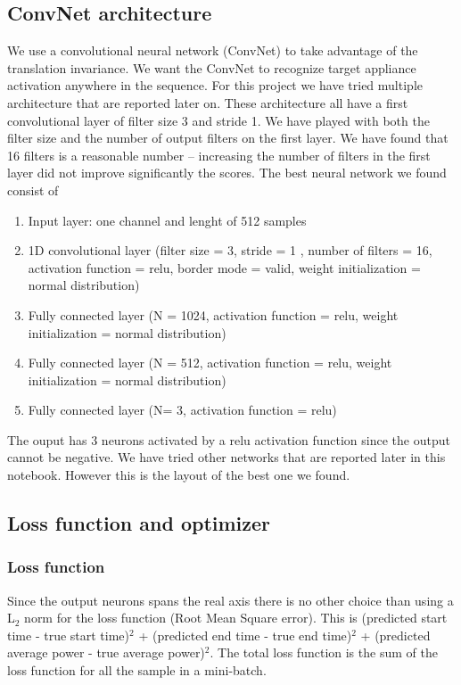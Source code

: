 \documentclass[11pt]{article}
\begin{document}
\subsection{ConvNet architecture}


We use a convolutional neural network (ConvNet) to take advantage of the translation invariance. We want the ConvNet to recognize target appliance activation anywhere in the sequence. For this project we have tried multiple architecture that are reported later on. These architecture all have a first convolutional layer of filter size 3 and stride 1. We have played with both the filter size and the number of output filters on the first layer. We have found that 16 filters is a reasonable number -- increasing the number of filters in the first layer did not improve significantly the scores.
The best neural network we found consist of
\begin{enumerate}
\item Input layer: one channel and lenght of 512 samples
\item 1D convolutional layer (filter size = 3, stride = 1 , number of filters = 16, activation function = relu, border mode = valid, weight initialization = normal distribution)
\item Fully connected layer (N = 1024, activation function = relu, weight initialization = normal distribution)
\item Fully connected layer (N = 512, activation function = relu, weight initialization = normal distribution)
\item Fully connected layer (N= 3, activation function = relu)
\end{enumerate}
The ouput has 3 neurons activated by a relu activation function since the output cannot be negative. We have tried other networks that are reported later in this notebook. However this is the layout of the best one we found.


\subsection{Loss function and optimizer}
\subsubsection{Loss function}
Since the output neurons spans the real axis there is no other choice than using a L$_2$ norm for the loss function (Root Mean Square error). This is (predicted start time - true start time)$^2$ + (predicted end time - true end time)$^2$ + (predicted average power - true average power)$^2$. The total loss function is the sum of the loss function for all the sample in a mini-batch.
\end{document}
